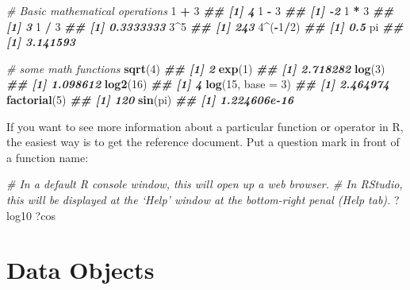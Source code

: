 \documentclass[
]{book}
\newenvironment{Shaded}{\begin{snugshade}}{\end{snugshade}}
\newcommand{\AttributeTok}[1]{\textcolor[rgb]{0.13,0.29,0.53}{#1}}
\newcommand{\CommentTok}[1]{\textcolor[rgb]{0.56,0.35,0.01}{\textit{#1}}}
\newcommand{\DecValTok}[1]{\textcolor[rgb]{0.00,0.00,0.81}{#1}}
\newcommand{\DocumentationTok}[1]{\textcolor[rgb]{0.56,0.35,0.01}{\textbf{\textit{#1}}}}
\newcommand{\FunctionTok}[1]{\textcolor[rgb]{0.13,0.29,0.53}{\textbf{#1}}}
\newcommand{\NormalTok}[1]{#1}
\newcommand{\SpecialCharTok}[1]{\textcolor[rgb]{0.81,0.36,0.00}{\textbf{#1}}}
\theoremstyle{definition}
\theoremstyle{definition}
\theoremstyle{definition}
\theoremstyle{definition}
\theoremstyle{remark}
\begin{document}
\begin{Shaded}
\begin{Highlighting}[]
    \CommentTok{\# Basic mathematical operations}
    \DecValTok{1} \SpecialCharTok{+} \DecValTok{3}
\DocumentationTok{\#\# [1] 4}
    \DecValTok{1} \SpecialCharTok{{-}} \DecValTok{3}
\DocumentationTok{\#\# [1] {-}2}
    \DecValTok{1} \SpecialCharTok{*} \DecValTok{3}
\DocumentationTok{\#\# [1] 3}
    \DecValTok{1} \SpecialCharTok{/} \DecValTok{3}
\DocumentationTok{\#\# [1] 0.3333333}
    \DecValTok{3}\SpecialCharTok{\^{}}\DecValTok{5}
\DocumentationTok{\#\# [1] 243}
    \DecValTok{4}\SpecialCharTok{\^{}}\NormalTok{(}\SpecialCharTok{{-}}\DecValTok{1}\SpecialCharTok{/}\DecValTok{2}\NormalTok{)}
\DocumentationTok{\#\# [1] 0.5}
\NormalTok{    pi}
\DocumentationTok{\#\# [1] 3.141593}
    
    \CommentTok{\# some math functions}
    \FunctionTok{sqrt}\NormalTok{(}\DecValTok{4}\NormalTok{)}
\DocumentationTok{\#\# [1] 2}
    \FunctionTok{exp}\NormalTok{(}\DecValTok{1}\NormalTok{)}
\DocumentationTok{\#\# [1] 2.718282}
    \FunctionTok{log}\NormalTok{(}\DecValTok{3}\NormalTok{)}
\DocumentationTok{\#\# [1] 1.098612}
    \FunctionTok{log2}\NormalTok{(}\DecValTok{16}\NormalTok{)}
\DocumentationTok{\#\# [1] 4}
    \FunctionTok{log}\NormalTok{(}\DecValTok{15}\NormalTok{, }\AttributeTok{base =} \DecValTok{3}\NormalTok{)}
\DocumentationTok{\#\# [1] 2.464974}
    \FunctionTok{factorial}\NormalTok{(}\DecValTok{5}\NormalTok{)}
\DocumentationTok{\#\# [1] 120}
    \FunctionTok{sin}\NormalTok{(pi)}
\DocumentationTok{\#\# [1] 1.224606e{-}16}
\end{Highlighting}
\end{Shaded}

If you want to see more information about a particular function or operator in R, the easiest way is to get the reference document. Put a question mark in front of a function name:

\begin{Shaded}
\begin{Highlighting}[]
    \CommentTok{\# In a default R console window, this will open up a web browser.}
    \CommentTok{\# In RStudio, this will be displayed at the ‘Help’ window at the bottom{-}right penal (Help tab). }
\NormalTok{    ?log10}
\NormalTok{    ?cos}
\end{Highlighting}
\end{Shaded}

\hypertarget{data-objects}{%
\section{Data Objects}\label{data-objects}}
\end{document}
